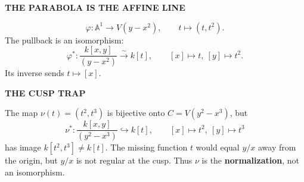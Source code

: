 \documentclass[9pt,a4paper]{extarticle}
\newcommand{\A}{\mathbb{A}}
\newcommand{\kk}{k}
\newcommand{\eyebrow}[1]{{\fontsize{7.2}{8}\selectfont\bfseries\color{teal}\MakeUppercase{#1}}}
\begin{document}
\vspace{5pt}
\begin{quietbox}
\begin{minipage}[t]{.42\textwidth}
\eyebrow{The parabola is the affine line}\par\vspace{4pt}
\[
\varphi:\A^1\to V(y-x^2),\qquad t\mapsto(t,t^2).
\]
The pullback is an isomorphism:
\[
\varphi^*:\frac{\kk[x,y]}{(y-x^2)}\xrightarrow{\sim}\kk[t],
\qquad [x]\mapsto t,\ [y]\mapsto t^2.
\]
Its inverse sends $t\mapsto[x]$.
\end{minipage}\hfill
\begin{minipage}[t]{.52\textwidth}
\begin{center}
\end{center}
\end{minipage}
\end{quietbox}

\vspace{6pt}
\begin{coralbox}
\begin{minipage}[t]{.35\textwidth}
\eyebrow{The cusp trap}\par\vspace{4pt}
\begin{center}
\end{center}
\end{minipage}\hfill
\begin{minipage}[t]{.60\textwidth}
The map $\nu(t)=(t^2,t^3)$ is bijective onto $C=V(y^2-x^3)$, but
\[
\nu^*:\frac{\kk[x,y]}{(y^2-x^3)}\hookrightarrow\kk[t],
\qquad [x]\mapsto t^2,\ [y]\mapsto t^3
\]
has image $\kk[t^2,t^3]\neq\kk[t]$. The missing function $t$ would equal $y/x$ away from the origin, but $y/x$ is not regular at the cusp. Thus $\nu$ is the \textbf{normalization}, not an isomorphism.
\end{minipage}
\end{coralbox}
\newpage
\end{document}
